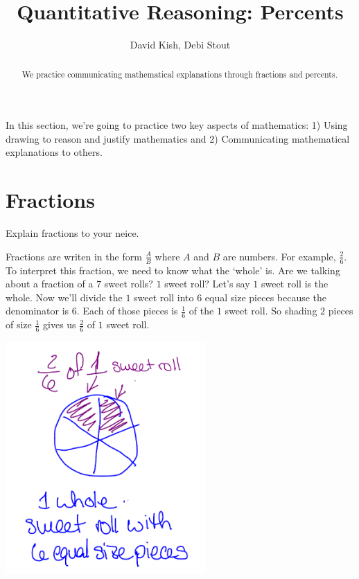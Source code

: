 \documentclass{ximera}
\author{David Kish, Debi Stout}
\title{Quantitative Reasoning: Percents}
\begin{document}
\begin{abstract}
We practice communicating mathematical explanations through fractions and percents.
\end{abstract}
\maketitle


In this section, we're going to practice two key aspects of mathematics: 1) Using drawing to reason and justify mathematics and 2) Communicating mathematical explanations to others.

\section{Fractions}

\begin{example}
Explain fractions to your neice.

\begin{explanation}

Fractions are writen in the form $\frac{A}{B}$ where $A$ and $B$ are numbers. For example, $\frac{2}{6}$.  To interpret this fraction, we need to know what the `whole' is. Are we talking about a fraction of a $7$ sweet rolls? $1$ sweet roll? Let's say $1$ sweet roll is the whole. Now we'll divide the $1$ sweet roll into $6$ equal size pieces because the denominator is $6$. Each of those pieces is $\frac{1}{6}$ of the $1$ sweet roll. So shading $2$ pieces of size $\frac{1}{6}$ gives us $\frac{2}{6}$ of $1$ sweet roll.

\begin{image}
    \includegraphics[width=3in]{fractionpic.png}
\end{image}
\end{explanation}
\end{example}
\end{document}
